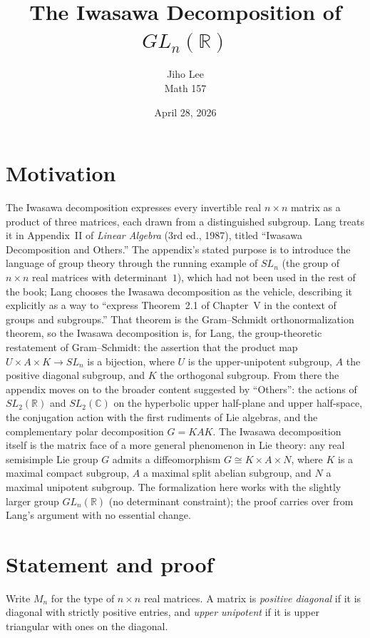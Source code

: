 \documentclass[11pt]{article}
\title{The Iwasawa Decomposition of $GL_n(\mathbb{R})$}
\author{Jiho Lee \\ Math 157}
\date{April 28, 2026}
\begin{document}
\maketitle

\section*{Motivation}

The Iwasawa decomposition expresses every invertible real $n \times n$
matrix as a product of three matrices, each drawn from a distinguished
subgroup. Lang treats it in Appendix~II of \emph{Linear Algebra} (3rd ed.,
1987), titled ``Iwasawa Decomposition and Others.'' The appendix's stated
purpose is to introduce the language of group theory through the running
example of $SL_n$ (the group of $n \times n$ real matrices with
determinant~$1$), which had not been used in the rest of the book; Lang
chooses the Iwasawa decomposition as the vehicle, describing it
explicitly as a way to ``express Theorem~2.1 of Chapter~V in the context
of groups and subgroups.'' That theorem is the Gram--Schmidt
orthonormalization theorem, so the Iwasawa decomposition is, for Lang,
the group-theoretic restatement of Gram--Schmidt: the assertion that the
product map $U \times A \times K \to SL_n$ is a bijection, where $U$ is
the upper-unipotent subgroup, $A$ the positive diagonal subgroup, and
$K$ the orthogonal subgroup. From there the appendix moves on to the
broader content suggested by ``Others'': the actions of
$SL_2(\mathbb{R})$ and $SL_2(\mathbb{C})$ on the hyperbolic upper
half-plane and upper half-space, the conjugation action with the first
rudiments of Lie algebras, and the complementary polar decomposition
$G = KAK$. The Iwasawa decomposition itself is the matrix face of a
more general phenomenon in Lie theory: any real semisimple Lie group
$G$ admits a diffeomorphism $G \cong K \times A \times N$, where $K$
is a maximal compact subgroup, $A$ a maximal split abelian subgroup,
and $N$ a maximal unipotent subgroup. The formalization here works
with the slightly larger group $GL_n(\mathbb{R})$ (no determinant
constraint); the proof carries over from Lang's argument with no
essential change.

\section*{Statement and proof}

Write $M_n$ for the type of $n \times n$ real matrices. A matrix is
\emph{positive diagonal} if it is diagonal with strictly positive
entries, and \emph{upper unipotent} if it is upper triangular with ones
on the diagonal.
\end{document}
